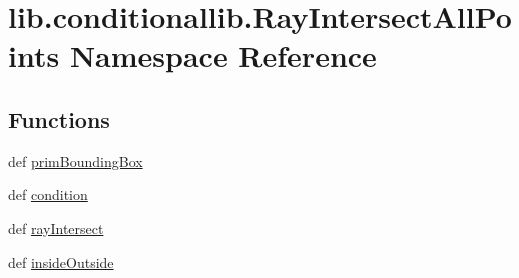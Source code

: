\hypertarget{namespacelib_1_1conditionallib_1_1_ray_intersect_all_points}{\section{lib.\-conditionallib.\-Ray\-Intersect\-All\-Points Namespace Reference}
\label{namespacelib_1_1conditionallib_1_1_ray_intersect_all_points}
}
\subsection*{Functions}
\begin{DoxyCompactItemize}
\item 
def \hyperlink{namespacelib_1_1conditionallib_1_1_ray_intersect_all_points_a05fa9fd70df4258d8b5e8e9daf245f4a}{prim\-Bounding\-Box}
\item 
def \hyperlink{namespacelib_1_1conditionallib_1_1_ray_intersect_all_points_a71a5daf2876a53003c29d51415328633}{condition}
\item 
def \hyperlink{namespacelib_1_1conditionallib_1_1_ray_intersect_all_points_ae6a0f6fdf24a9fd4bcdd0254050bd672}{ray\-Intersect}
\item 
def \hyperlink{namespacelib_1_1conditionallib_1_1_ray_intersect_all_points_a23f0820211f5fceff4db7f929a4a49c8}{inside\-Outside}
\end{DoxyCompactItemize}


